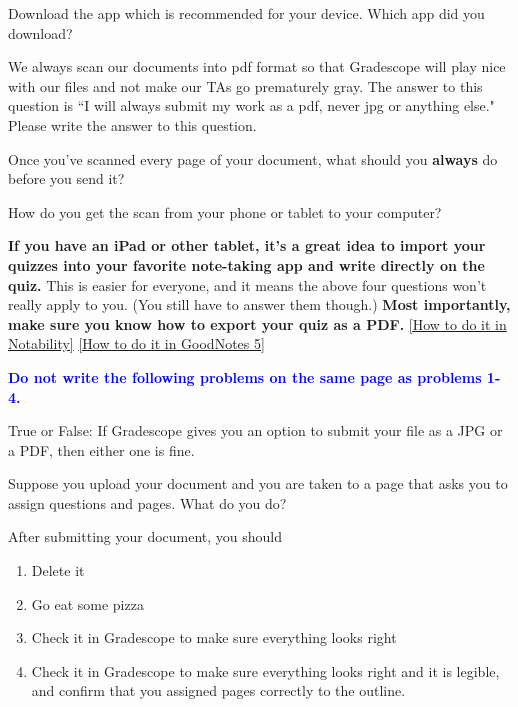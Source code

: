 \documentclass[12pt]{article}
\begin{document}
\begin{enumerate}
  \setcounter{problemnumber}{0}
\Problem Download the app which is recommended for your device. Which app did you download?
\vfill

\Problem We always scan our documents into pdf format so that Gradescope will play nice with our files and not make our TAs go prematurely gray. The answer to this question is ``I will always submit my work as a pdf, never jpg or anything else." Please write the answer to this question. 
\vfill

\Problem Once you've scanned every page of your document, what should you \textbf{always} do before you send it?
\vfill

\Problem How do you get the scan from your phone or tablet to your computer?
\vfill

\pagebreak


\textbf{If you have an iPad or other tablet, it's a great idea to import your quizzes into your favorite note-taking app and write directly on the quiz.} This is easier for everyone, and it means the above four questions won't really apply to you. (You still have to answer them though.)
\textbf{Most importantly, make sure you know how to export your quiz as a PDF.} 
\href{https://support.gingerlabs.com/hc/en-us/articles/205228298-Exporting-Notes}{[How to do it in Notability]} 
\href{https://support.goodnotes.com/hc/en-us/articles/360000630495-How-to-export-documents-or-pages-in-GoodNotes-5}{[How to do it in GoodNotes 5]}

\mbox{}

\textcolor{blue}{\textbf{Do not write the following problems on the same page as problems 1-4.}}

\Problem True or False: If Gradescope gives you an option to submit your file as a JPG or a PDF, then either one is fine. 
\vspace*{24pt}
	
\Problem Suppose you upload your document and you are taken to a page that asks you to assign questions and pages. What do you do?
\vfill


\Problem After submitting your document, you should
	\begin{enumerate}
	\item Delete it
	\item Go eat some pizza
	\item Check it in Gradescope to make sure everything looks right
	\item Check it in Gradescope to make sure everything looks right and it is legible, and confirm that you assigned pages correctly to the outline.
	\end{enumerate}
\vspace*{24pt}


\end{enumerate}
\end{document}
